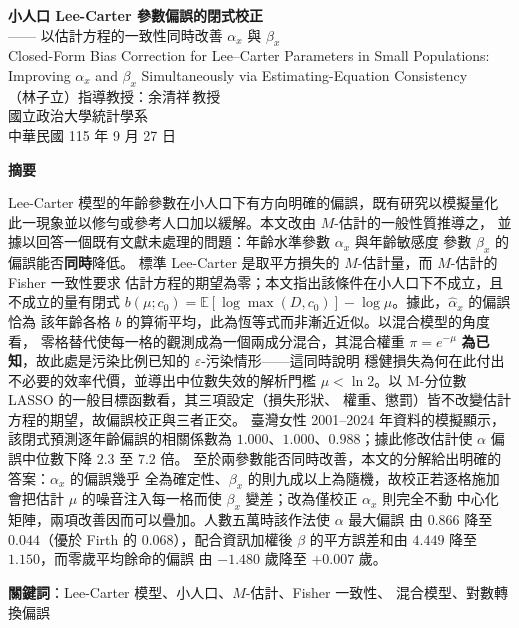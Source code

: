 \documentclass[UTF8, fontset=macnew, a4paper, 12pt]{ctexart}
\newcommand{\Ex}{\mathbb{E}}
\begin{document}
\begin{center}
{\bfseries 小人口 Lee-Carter 參數偏誤的閉式校正}\\[4pt]
{ —— 以估計方程的一致性同時改善 $\alpha_x$ 與 $\beta_x$}\\[6pt]
{ Closed-Form Bias Correction for Lee--Carter Parameters in Small
Populations:}\\[2pt]
{ Improving $\alpha_x$ and $\beta_x$ Simultaneously via
Estimating-Equation Consistency}\\[12pt]
{ （林子立）\quad 指導教授：余清祥\,教授}\\[4pt]
{ 國立政治大學統計學系}\\[4pt]
{ 中華民國 115 年 9 月 27 日}
\end{center}

\vspace{6pt}
\begin{center}
\begin{minipage}{0.92\textwidth}
\small
\textbf{摘要}\par\vspace{4pt}
Lee-Carter 模型的年齡參數在小人口下有方向明確的偏誤，既有研究以模擬量化
此一現象並以修勻或參考人口加以緩解。本文改由 $M$-估計的一般性質推導之，
並據以回答一個既有文獻未處理的問題：年齡水準參數 $\alpha_x$ 與年齡敏感度
參數 $\beta_x$ 的偏誤能否\textbf{同時}降低。
標準 Lee-Carter 是取平方損失的 $M$-估計量，而 $M$-估計的 Fisher 一致性要求
估計方程的期望為零；本文指出該條件在小人口下不成立，且不成立的量有閉式
$b(\mu;c_0)=\Ex[\log\max(D,c_0)]-\log\mu$。據此，$\hat\alpha_x$ 的偏誤恰為
該年齡各格 $b$ 的算術平均，此為恆等式而非漸近近似。以混合模型的角度看，
零格替代使每一格的觀測成為一個兩成分混合，其混合權重 $\pi=e^{-\mu}$
\textbf{為已知}，故此處是污染比例已知的 $\varepsilon$-污染情形——這同時說明
穩健損失為何在此付出不必要的效率代價，並導出中位數失效的解析門檻
$\mu<\ln 2$。以 M-分位數 LASSO 的一般目標函數看，其三項設定（損失形狀、
權重、懲罰）皆不改變估計方程的期望，故偏誤校正與三者正交。
臺灣女性 2001--2024 年資料的模擬顯示，該閉式預測逐年齡偏誤的相關係數為
$1.000$、$1.000$、$0.988$；據此修改估計使 $\alpha$ 偏誤中位數下降 $2.3$ 至 $7.2$ 倍。
至於兩參數能否同時改善，本文的分解給出明確的答案：$\alpha_x$ 的偏誤幾乎
全為確定性、$\beta_x$ 的則九成以上為隨機，故校正若逐格施加會把估計 $\mu$
的噪音注入每一格而使 $\beta_x$ 變差；改為僅校正 $\alpha_x$ 則完全不動
中心化矩陣，兩項改善因而可以疊加。人數五萬時該作法使 $\alpha$ 最大偏誤
由 $0.866$ 降至 $0.044$（優於 Firth 的 $0.068$），配合資訊加權後
$\beta$ 的平方誤差和由 $4.449$ 降至 $1.150$，而零歲平均餘命的偏誤
由 $-1.480$ 歲降至 $+0.007$ 歲。
\par\vspace{6pt}
\textbf{關鍵詞}：Lee-Carter 模型、小人口、$M$-估計、Fisher 一致性、
混合模型、對數轉換偏誤
\end{minipage}
\end{center}
\end{document}
